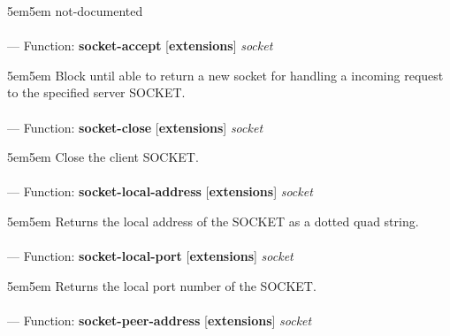 \begin{adjustwidth}{5em}{5em}
not-documented
\end{adjustwidth}

\paragraph{}
\label{EXTENSIONS:SOCKET-ACCEPT}
--- Function: \textbf{socket-accept} [\textbf{extensions}] \textit{socket}

\begin{adjustwidth}{5em}{5em}
Block until able to return a new socket for handling a incoming request to the specified server SOCKET.
\end{adjustwidth}

\paragraph{}
\label{EXTENSIONS:SOCKET-CLOSE}
--- Function: \textbf{socket-close} [\textbf{extensions}] \textit{socket}

\begin{adjustwidth}{5em}{5em}
Close the client SOCKET.
\end{adjustwidth}

\paragraph{}
\label{EXTENSIONS:SOCKET-LOCAL-ADDRESS}
--- Function: \textbf{socket-local-address} [\textbf{extensions}] \textit{socket}

\begin{adjustwidth}{5em}{5em}
Returns the local address of the SOCKET as a dotted quad string.
\end{adjustwidth}

\paragraph{}
\label{EXTENSIONS:SOCKET-LOCAL-PORT}
--- Function: \textbf{socket-local-port} [\textbf{extensions}] \textit{socket}

\begin{adjustwidth}{5em}{5em}
Returns the local port number of the SOCKET.
\end{adjustwidth}

\paragraph{}
\label{EXTENSIONS:SOCKET-PEER-ADDRESS}
--- Function: \textbf{socket-peer-address} [\textbf{extensions}] \textit{socket}

